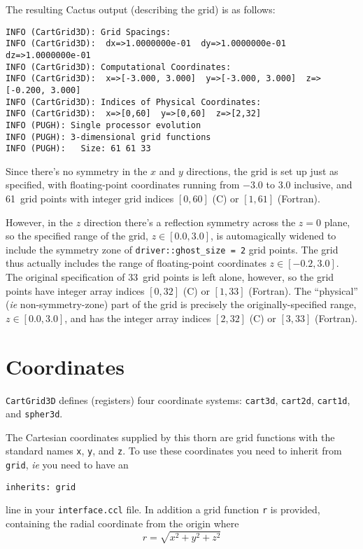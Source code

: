 \documentclass{article}
\begin{document}
The resulting Cactus output (describing the grid) is as follows:
\begin{verbatim}
INFO (CartGrid3D): Grid Spacings:
INFO (CartGrid3D):  dx=>1.0000000e-01  dy=>1.0000000e-01  dz=>1.0000000e-01  
INFO (CartGrid3D): Computational Coordinates:
INFO (CartGrid3D):  x=>[-3.000, 3.000]  y=>[-3.000, 3.000]  z=>[-0.200, 3.000]  
INFO (CartGrid3D): Indices of Physical Coordinates:
INFO (CartGrid3D):  x=>[0,60]  y=>[0,60]  z=>[2,32]  
INFO (PUGH): Single processor evolution
INFO (PUGH): 3-dimensional grid functions
INFO (PUGH):   Size: 61 61 33
\end{verbatim}

Since there's no symmetry in the $x$ and $y$ directions, the grid
is set up just as specified, with floating-point coordinates running
from $-3.0$ to $3.0$ inclusive, and 61~grid points with integer grid
indices $[0,60]$ (C) or $[1,61]$ (Fortran).

However, in the $z$ direction there's a reflection symmetry across the
$z=0$ plane, so the specified range of the grid, $z \in [0.0,3.0]$,
is automagically widened to include the symmetry zone of
\verb|driver::ghost_size = 2| grid points.  The grid thus actually
includes the range of floating-point coordinates $z \in [-0.2,3.0]$.
The original specification of 33~grid points is left alone, however,
so the grid points have integer array indices $[0,32]$ (C) or
$[1,33]$ (Fortran).
The ``physical'' ({\it ie} non-symmetry-zone) part of the grid is
precisely the originally-specified range, $z \in [0.0,3.0]$, and
has the integer array indices $[2,32]$ (C) or $[3,33]$ (Fortran).


\section{Coordinates}

\verb|CartGrid3D| defines (registers) four coordinate systems:
\verb|cart3d|, \verb|cart2d|, \verb|cart1d|, and \verb|spher3d|.

The Cartesian coordinates supplied by this thorn are grid functions
with the standard names \verb|x|, \verb|y|, and \verb|z|.  To use
these coordinates you need to inherit from \verb|grid|, {\it ie} you
need to have an
\begin{verbatim}
inherits: grid
\end{verbatim}
line in your \verb|interface.ccl| file.
In addition a grid function \verb|r| is provided, containing the
radial coordinate from the origin where
$$
r = \sqrt{x^2+y^2+z^2}
$$
\end{document}
